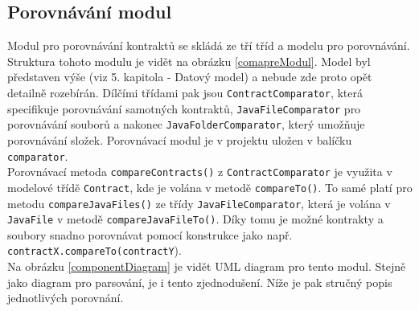 	    


		

	    \subsection{Porovnávání modul}
	    	Modul pro porovnávání kontraktů se skládá ze tří tříd a modelu pro porovnávání. Struktura tohoto modulu je vidět na obrázku \ref{comapreModul}. Model byl představen výše (viz 5. kapitola - Datový model) a nebude zde proto opět detailně rozebírán. Dílčími třídami pak jsou \texttt{ContractComparator}, která specifikuje porovnávání samotných kontraktů, \texttt{JavaFileComparator} pro porovnávání souborů a nakonec \texttt{JavaFolderComparator}, který umožňuje porovnávání složek. Porovnávací modul je v projektu uložen v balíčku \texttt{comparator}.\\
	    	
	    	Porovnávací metoda \texttt{compareContracts()} z \texttt{ContractComparator} je využita v modelové třídě \texttt{Contract}, kde je volána v metodě \texttt{compareTo()}. To samé platí pro metodu \texttt{compareJavaFiles()} ze třídy \texttt{JavaFileComparator}, která je volána v \texttt{JavaFile} v metodě \texttt{compareJavaFileTo()}. Díky tomu je možné kontrakty a soubory snadno porovnávat pomocí konstrukce jako např. \texttt{contractX.compareTo(contractY}).\\
	    	
			Na obrázku \ref{componentDiagram} je vidět UML diagram pro tento modul. Stejně jako diagram pro parsování, je i tento zjednodušení. Níže je pak stručný popis jednotlivých porovnání.    	
	    	
